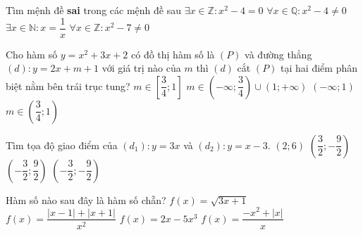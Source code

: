 \begin{ex}%
	Tìm mệnh đề \textbf{sai} trong các mệnh đề sau
	\choice
	{ $\exists x \in \mathbb{Z}:x^2-4=0$}
	{\True $\forall x \in \mathbb{Q}:x^2-4\neq 0$}
	{$\exists x \in \mathbb{N}:x=\dfrac{1}{x}$}
	{$\forall x \in \mathbb{Z}:x^2-7\neq 0$}
\end{ex}


\begin{ex}%
	Cho hàm số $y=x^2+3x+2$ có đồ thị hàm số là $(P)$ và đường thẳng $(d):y=2x+m+1$ với giá trị nào của $m$ thì $(d)$ cắt $(P)$ tại hai điểm phân biệt nằm bên trái trục tung?
	\choice
	{$m\in \left[\dfrac{3}{4};1\right]$}
	{$m\in \left(-\infty;\dfrac{3}{4}\right)\cup \left(1;+\infty\right)$}
	{$\left(-\infty;1\right)$}
	{\True $m\in \left(\dfrac{3}{4};1\right)$}
\end{ex}


\begin{ex}%
	Tìm tọa độ giao điểm của $(d_1):y=3x$ và $(d_2):y=x-3$.
	\choice
	{$(2;6)$ }
	{$ \left(\dfrac{3}{2};-\dfrac{9}{2}\right)$}
	{$ \left(-\dfrac{3}{2};\dfrac{9}{2}\right)$}
	{\True $ \left(-\dfrac{3}{2};-\dfrac{9}{2}\right)$}
\end{ex}


\begin{ex}%
	Hàm số nào sau đây là hàm số chẵn?
	\choice
	{ $f(x)=\sqrt{3x+1}$}
	{\True $f(x)=\dfrac{|x-1|+|x+1|}{x^2}$}
	{$f(x)=2x-5x^3$}
	{$f(x)=\dfrac{-x^2+|x|}{x}$}
\end{ex}


